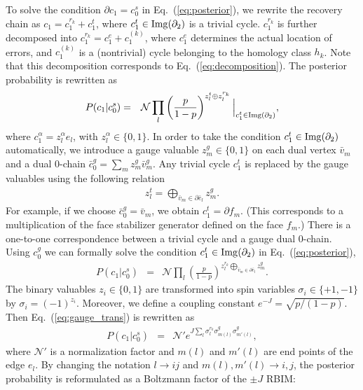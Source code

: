 To solve the condition $\partial c_1 = c_0^s $ in Eq.\ (\ref{eq:posterior}), we rewrite the recovery chain as $c_1 = c_1^{r_k}+c_1^{t}$, where $c_1^{t}\in {\rm Img}(\partial _2)$ is a trivial cycle.
$c_1^{r_k}$ is further decomposed into $c_1^{r_k} = c_1^e+ c_1^{(k)}$, where $c_1^e$ determines the actual location of errors, and $c_1^{(k)}$ is a (nontrivial) cycle belonging to the homology class $h_k$.
Note that this decomposition corresponds to Eq.\ (\ref{eq:decomposition}).
The posterior probability is rewritten as
\begin{eqnarray}
P( c_1  | c_0^{s}) &=&\mathcal{N} \prod _{l }  \left( \frac{p}{1-p} \right) ^{z_l^{t} \oplus z_l^{r_k}} \Bigl|_{c_1^{t} \in {\rm Img}(\partial _2)},
\end{eqnarray}
where $c_1^{\alpha}=z_l^{\alpha} e_l$, with $z_l^{\alpha} \in \{ 0,1\}$. 
In order to take the condition $c_1^{t} \in {\rm Img}(\partial _2)$
automatically, 
we introduce a gauge valuable $z_m^g \in \{ 0,1\}$ on each dual vertex $\bar v_m$
and a dual 0-chain $\bar c_0^{g} = \sum _m z_m^g \bar v^g_m$.
Any trivial cycle $c_1^{t}$ is replaced by the gauge valuables using the following relation
\begin{eqnarray}
z_l^t = \bigoplus _{\bar v_m \in \partial \bar e_l} z_m^g.
\end{eqnarray}
For example, if we choose $\bar c_0^{g} = \bar v_m$, we obtain $c_1^{t}= \partial f_m$.
(This corresponds to a multiplication of the face stabilizer generator defined on the face $f_m$.)
There is a one-to-one correspondence between a trivial cycle and a gauge dual 0-chain.
Using $c_0^g$ we can formally solve the condition 
$c_1^{t} \in {\rm Img}(\partial _2)$ in Eq.\ (\ref{eq:posterior}),
\begin{eqnarray}
P( c_1  | c_0^{s}) &=&\mathcal{N} \prod _{l }  \left( \frac{p}{1-p} \right) ^{ z_l^{r_k}\bigoplus _{\bar v_m \in\partial \bar e_l} z_m^g}.
\label{eq:gauge_trans}
\end{eqnarray}
The binary valuables $z_i\in \{ 0,1\}$ are transformed into spin variables $\sigma _i \in \{ +1,-1\}$ by $\sigma _i= (-1)^{z_i}$.
Moreover, we define a coupling constant $e^{-J} = \sqrt{p/(1-p)}$.
Then Eq.\ (\ref{eq:gauge_trans}) is rewritten as 
\begin{eqnarray}
P( c_1  | c_0^{s}) &=&\mathcal{N}' e ^{J \sum _l \sigma_l^{r_k}\sigma^g _{m(l)}\sigma^g _{m'(l)}},
\end{eqnarray}
where $\mathcal{N}'$ is a normalization factor and $m(l)$ and $m'(l)$ are end points of the edge $e_l$.
By changing the notation $l \rightarrow ij$ and $m(l), m'(l) \rightarrow i,j$, the posterior probability is reformulated as a Boltzmann factor of the $\pm J$ RBIM:
